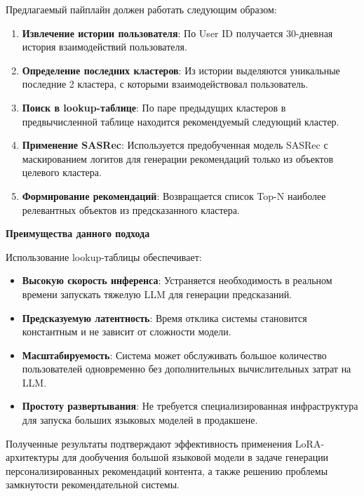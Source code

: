 Предлагаемый пайплайн должен работать следующим образом:

\begin{enumerate}
    \item \textbf{Извлечение истории пользователя}: По User ID получается 30-дневная история взаимодействий пользователя.
    
    \item \textbf{Определение последних кластеров}: Из истории выделяются уникальные последние 2 кластера, с которыми взаимодействовал пользователь.
    
    \item \textbf{Поиск в lookup-таблице}: По паре предыдущих кластеров в предвычисленной таблице находится рекомендуемый следующий кластер.
    
    \item \textbf{Применение SASRec}: Используется предобученная модель SASRec с маскированием логитов для генерации рекомендаций только из объектов целевого кластера.
    
    \item \textbf{Формирование рекомендаций}: Возвращается список Top-N наиболее релевантных объектов из предсказанного кластера.
\end{enumerate}

\textbf{Преимущества данного подхода}

Использование lookup-таблицы обеспечивает:

\begin{itemize}
    \item \textbf{Высокую скорость инференса}: Устраняется необходимость в реальном времени запускать тяжелую LLM для генерации предсказаний.
    
    \item \textbf{Предсказуемую латентность}: Время отклика системы становится константным и не зависит от сложности модели.
    
    \item \textbf{Масштабируемость}: Система может обслуживать большое количество пользователей одновременно без дополнительных вычислительных затрат на LLM.
    
    \item \textbf{Простоту развертывания}: Не требуется специализированная инфраструктура для запуска больших языковых моделей в продакшене.
\end{itemize}

Полученные результаты подтверждают эффективность применения LoRA-архитектуры для дообучения большой языковой модели в задаче генерации персонализированных рекомендаций контента, а также решению проблемы замкнутости рекомендательной системы.

